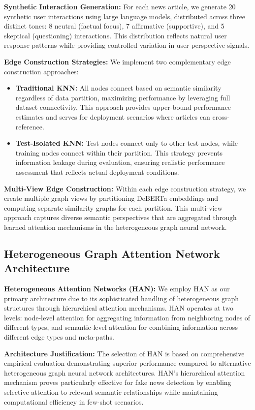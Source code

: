 \textbf{Synthetic Interaction Generation:} For each news article, we generate 20 synthetic user interactions using large language models, distributed across three distinct tones: 8 neutral (factual focus), 7 affirmative (supportive), and 5 skeptical (questioning) interactions. This distribution reflects natural user response patterns while providing controlled variation in user perspective signals.

\textbf{Edge Construction Strategies:} We implement two complementary edge construction approaches:

\begin{itemize}
\item \textbf{Traditional KNN:} All nodes connect based on semantic similarity regardless of data partition, maximizing performance by leveraging full dataset connectivity. This approach provides upper-bound performance estimates and serves for deployment scenarios where articles can cross-reference.

\item \textbf{Test-Isolated KNN:} Test nodes connect only to other test nodes, while training nodes connect within their partition. This strategy prevents information leakage during evaluation, ensuring realistic performance assessment that reflects actual deployment conditions.
\end{itemize}

\textbf{Multi-View Edge Construction:} Within each edge construction strategy, we create multiple graph views by partitioning DeBERTa embeddings and computing separate similarity graphs for each partition. This multi-view approach captures diverse semantic perspectives that are aggregated through learned attention mechanisms in the heterogeneous graph neural network.

\subsection{Heterogeneous Graph Attention Network Architecture}

\textbf{Heterogeneous Attention Networks (HAN):} We employ HAN as our primary architecture due to its sophisticated handling of heterogeneous graph structures through hierarchical attention mechanisms. HAN operates at two levels: node-level attention for aggregating information from neighboring nodes of different types, and semantic-level attention for combining information across different edge types and meta-paths.

\textbf{Architecture Justification:} The selection of HAN is based on comprehensive empirical evaluation demonstrating superior performance compared to alternative heterogeneous graph neural network architectures. HAN's hierarchical attention mechanism proves particularly effective for fake news detection by enabling selective attention to relevant semantic relationships while maintaining computational efficiency in few-shot scenarios.

